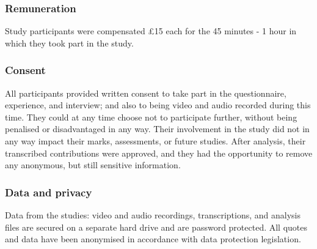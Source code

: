 \subsubsection{Remuneration}\label{sec: polaris-ethics-renumeration}
Study participants were compensated £15 each for the 45 minutes - 1 hour in which they took part in the study.

\subsubsection{Consent}\label{sec: polaris-ethics-consent}
All participants provided written consent to take part in the questionnaire, experience, and interview; and also to being video and audio recorded during this time. They could at any time choose not to participate further, without being penalised or disadvantaged in any way. Their involvement in the study did not in any way impact their marks, assessments, or future studies. After analysis, their transcribed contributions were approved, and they had the opportunity to remove any anonymous, but still sensitive information.

\subsubsection{Data and privacy}\label{sec: polaris-ethics-data}
Data from the studies: video and audio recordings, transcriptions, and analysis files are secured on a separate hard drive and are password protected. All quotes and data have been anonymised in accordance with data protection legislation.



